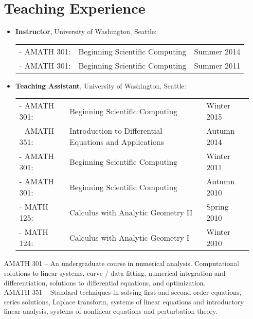 \documentclass{article}
\begin{document}
\section*{Teaching Experience}

\begin{itemize}
  \item {\bf Instructor}, University of Washington, Seattle:

    \begin{tabular}{p{2.5cm}p{9.9cm}l}
      - AMATH 301: & Beginning Scientific Computing      & Summer 2014 \\
      - AMATH 301: & Beginning Scientific Computing      & Summer 2011 \\
    \end{tabular}

  \item {\bf Teaching Assistant}, University of Washington, Seattle:

    \begin{tabular}{p{2.5cm}p{10cm}l}
      - AMATH 301: & Beginning Scientific Computing      & Winter 2015 \\
      - AMATH 351: & Introduction to Differential Equations and Applications & Autumn 2014 \\
      - AMATH 301: & Beginning Scientific Computing      & Winter 2011 \\
      - AMATH 301: & Beginning Scientific Computing      & Autumn 2010 \\
      - MATH 125:  & Calculus with Analytic Geometry II  & Spring 2010 \\
      - MATH 124:  & Calculus with Analytic Geometry I   & Winter 2010 \\
    \end{tabular}
\end{itemize}

\noindent
AMATH 301 -- An undergraduate course in numerical
analysis. Computational solutions to linear systems, curve / data
fitting, numerical integration and differentiation, solutions to
differential equations, and optimization. \\

\noindent
AMATH 351 -- Standard techniques in solving first and second order
equations, series solutions, Laplace transform, systems of linear
equations and introductory linear analysis, systems of nonlinear
equations and perturbation theory.
\end{document}
